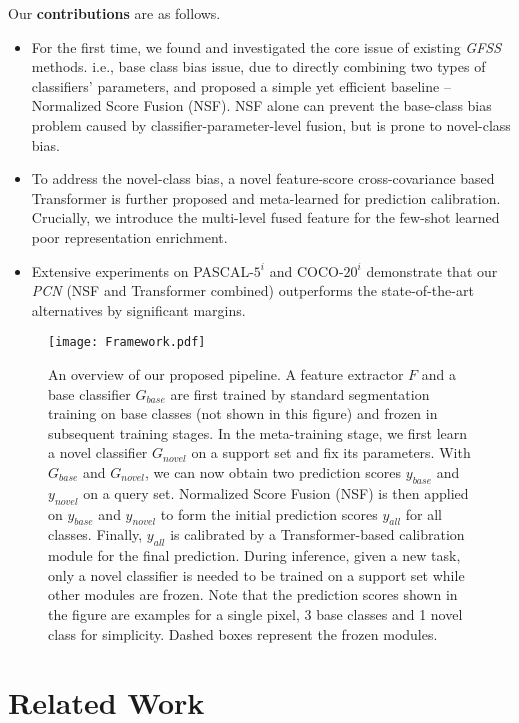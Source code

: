 \documentclass[journal]{IEEEtran}
\begin{document}
Our {\bf contributions} are as follows. 
\begin{itemize}
    \item For the first time, we found and investigated the core issue of existing \textit{GFSS} methods. i.e., base class bias issue, due to directly combining two types of classifiers' parameters, and proposed a simple yet efficient baseline -- Normalized Score Fusion (NSF). NSF alone can prevent the base-class bias problem caused by classifier-parameter-level fusion, but is prone to novel-class bias.
    \item To address the novel-class bias, a novel feature-score cross-covariance based Transformer is further proposed and meta-learned for prediction calibration. Crucially, we introduce the multi-level fused feature for the few-shot learned poor representation enrichment.
    \item Extensive experiments on PASCAL-$5^{i}$ and COCO-$20^{i}$ demonstrate that our \textit{PCN} (NSF and Transformer combined) outperforms the state-of-the-art alternatives by significant margins.
\end{itemize}


\begin{figure*}[ht]
    \centering
    \texttt{[image: Framework.pdf]}
    \caption{An overview of our proposed pipeline. 
    A feature extractor $F$ and a base classifier $G_{base}$ are first trained by standard segmentation training on base classes (not shown in this figure) and frozen in subsequent training stages.
    In the meta-training stage, we first learn a novel classifier $G_{novel}$ on a support set and fix its parameters.
    With $G_{base}$ and $G_{novel}$, we can now obtain two prediction scores $y_{base}$ and $y_{novel}$ on a query set.
    Normalized Score Fusion (NSF) is then applied on $y_{base}$ and $y_{novel}$ to form the initial prediction scores $y_{all}$ for all classes.
    Finally, $y_{all}$ is calibrated by a Transformer-based calibration module for the final prediction. 
    During inference, given a new task, only a novel classifier is needed to be trained on a support set while other modules are frozen.
    Note that the prediction scores shown in the figure are examples for a single pixel, 3 base classes and 1 novel class for simplicity.
    Dashed boxes represent the frozen modules.}
    \label{fig:framework}
\end{figure*}

\section{Related Work}
\end{document}
